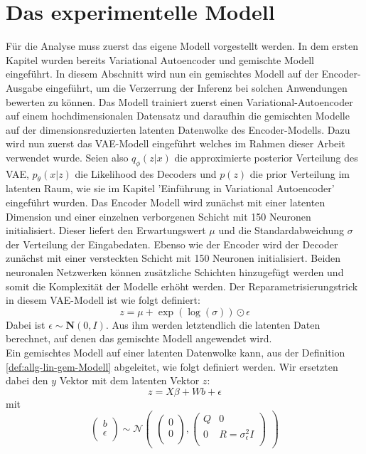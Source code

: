 \documentclass[%
thesis=student,%
coverpage=false,%
titlepage=false,%
headmarks=true, %
german,%
font=libertine, %
math=newpxtx, %
BCOR=5mm,%
coverBCOR=11mm%
]{tumbook}
\theoremstyle{break}
\begin{document}
\section{Das experimentelle Modell}
Für die Analyse muss zuerst das eigene Modell vorgestellt werden. 
In dem ersten Kapitel wurden bereits Variational Autoencoder und gemischte Modell eingeführt. In diesem Abschnitt wird nun ein gemischtes Modell auf der Encoder-Ausgabe eingeführt, um die Verzerrung der Inferenz bei solchen Anwendungen bewerten zu können. Das Modell trainiert zuerst einen Variational-Autoencoder auf einem hochdimensionalen Datensatz und daraufhin die gemischten Modelle auf der dimensionsreduzierten latenten Datenwolke des Encoder-Modells. Dazu wird nun zuerst das VAE-Modell eingeführt welches im Rahmen dieser Arbeit verwendet wurde. Seien also $q_\phi(z|x)$ die approximierte posterior Verteilung des VAE, $p_\theta(x|z)$ die Likelihood des Decoders und $p(z)$ die prior Verteilung im latenten Raum, wie sie im Kapitel 'Einführung in Variational Autoencoder' eingeführt wurden. Das Encoder Modell wird zunächst mit einer latenten Dimension und einer einzelnen verborgenen Schicht mit 150 Neuronen initialisiert. Dieser liefert den Erwartungswert $\mu$ und die Standardabweichung $\sigma$ der Verteilung der Eingabedaten. Ebenso wie der Encoder wird der Decoder zunächst mit einer versteckten Schicht mit 150 Neuronen initialisiert. Beiden neuronalen Netzwerken können zusätzliche Schichten hinzugefügt werden und somit die Komplexität der Modelle erhöht werden. 
Der Reparametrisierungstrick in diesem VAE-Modell ist wie folgt definiert:
$$z = \mu + \exp(\log(\sigma)) \odot \epsilon$$  Dabei ist $\epsilon \sim \mathbf{N}(0,I)$. Aus ihm werden letztendlich die latenten Daten berechnet, auf denen das gemischte Modell angewendet wird.\\
Ein gemischtes Modell auf einer latenten Datenwolke kann, aus der Definition \ref{def:allg-lin-gem-Modell} abgeleitet, wie folgt definiert werden. Wir ersetzten dabei den $y$ Vektor mit dem latenten Vektor $z$:
$$z = X\beta + Wb + \epsilon $$ \label{MM-auf-latentData}
mit
$$\begin{pmatrix}
		b \\
		\epsilon \\
\end{pmatrix}
\sim
\mathcal{N}
\begin{pmatrix}
\begin{pmatrix}		
	0 \\
	0 \\
\end{pmatrix},
\begin{pmatrix}
	Q & 0 \\
	0 & R = \sigma_\epsilon^2I \\
\end{pmatrix}
\end{pmatrix}$$
\end{document}
